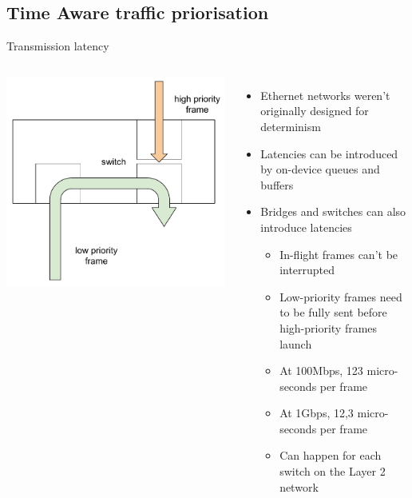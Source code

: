 \subsection{Time Aware traffic priorisation}

\begin{frame}{Transmission latency}
	\begin{columns}
		\includegraphics[width=1.1\textwidth]{slides/networking-tsn-taprio/switching_latency.pdf}
	\begin{itemize}
		\item Ethernet networks weren't originally designed for determinism
		\item Latencies can be introduced by on-device queues and buffers
		\item Bridges and switches can also introduce latencies
			\begin{itemize}
				\item In-flight frames can't be interrupted
				\item Low-priority frames need to be fully sent before high-priority frames launch
				\item At 100Mbps, 123 micro-seconds per frame
				\item At 1Gbps, 12,3 micro-seconds per frame
				\item Can happen for each switch on the Layer 2 network
			\end{itemize}
	\end{itemize}
	\end{columns}
\end{frame}


